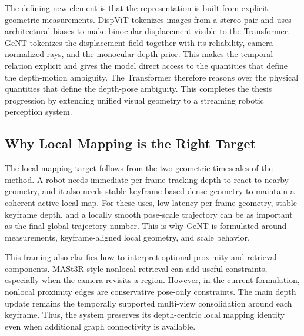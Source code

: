 The defining new element is that the representation is built from explicit geometric measurements.
DispViT tokenizes images from a stereo pair and uses architectural biases to make binocular displacement visible to the Transformer.
GeNT tokenizes the displacement field together with its reliability, camera-normalized rays, and the monocular depth prior.
This makes the temporal relation explicit and gives the model direct access to the quantities that define the depth-motion ambiguity.
The Transformer therefore reasons over the physical quantities that define the depth-pose ambiguity.
This completes the thesis progression by extending unified visual geometry to a streaming robotic perception system.

\subsection{Why Local Mapping is the Right Target}
The local-mapping target follows from the two geometric timescales of the method.
A robot needs immediate per-frame tracking depth to react to nearby geometry, and it also needs stable keyframe-based dense geometry to maintain a coherent active local map.
For these uses, low-latency per-frame geometry, stable keyframe depth, and a locally smooth pose-scale trajectory can be as important as the final global trajectory number.
This is why GeNT is formulated around measurements, keyframe-aligned local geometry, and scale behavior.

This framing also clarifies how to interpret optional proximity and retrieval components.
MASt3R-style nonlocal retrieval can add useful constraints, especially when the camera revisits a region.
However, in the current formulation, nonlocal proximity edges are conservative pose-only constraints.
The main depth update remains the temporally supported multi-view consolidation around each keyframe.
Thus, the system preserves its depth-centric local mapping identity even when additional graph connectivity is available.

